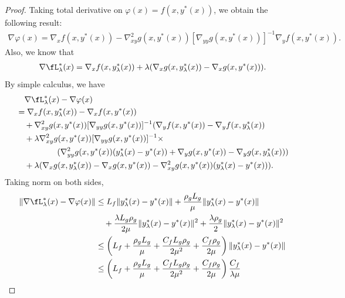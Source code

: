 \begin{proof}
Taking total derivative on $\varphi(x) = f(x,y^*(x))$, we obtain the following result:
\begin{align} \label{eq:hyper-grad}
    \nabla \varphi(x) = \nabla_x f(x,y^*(x)) - \nabla_{xy}^2 g(x,y^*(x)) [ \nabla_{yy} g(x,y^*(x))]^{-1} \nabla_y f(x,y^*(x)). 
\end{align}
Also, we know that
\begin{align*}
    \nabla \fL_{\lambda}^*(x) = \nabla_x f(x,y_{\lambda}^*(x)) + \lambda (\nabla_x g(x,y_{\lambda}^*(x)) - \nabla_x g(x,y^*(x))).
\end{align*}
By simple calculus, we have
\begin{align*}
    &\quad \nabla \fL_{\lambda}^*(x) - \nabla \varphi(x) \\
    &= \nabla_x f(x,y_{\lambda}^*(x)) - \nabla_x f(x,y^*(x)) \\
    &\quad + \nabla_{xy}^2 g(x,y^*(x)) [ \nabla_{yy} g(x,y^*(x))]^{-1} (\nabla_y f(x,y^*(x)) - \nabla_y f(x,y_{\lambda}^*(x)) \\
    &\quad + \lambda \nabla_{xy}^2 g(x,y^*(x)) [ \nabla_{yy} g(x,y^*(x))]^{-1} \times \\
    &~~~~~~~~~~~~~~~( \nabla_{yy}^2 g(x,y^*(x)) (y_{\lambda}^*(x) - y^*(x)) + \nabla_y g(x,y^*(x)) - \nabla_y g(x,y_{\lambda}^*(x)) ) \\
    &\quad + \lambda ( \nabla_x g(x,y_{\lambda}^*(x)) - \nabla_x  g(x,y^*(x)) - \nabla_{xy}^2 g(x,y^*(x)) (y_{\lambda}^*(x) - y^*(x)) ).
\end{align*}
Taking norm on both sides,
\begin{align*}
    \Vert \nabla \fL_{\lambda}^*(x) - \nabla \varphi(x) \Vert &\le L_f \Vert y_{\lambda}^*(x) - y^*(x) \Vert + \frac{\rho_g L_g}{\mu} \Vert y_{\lambda}^*(x) - y^*(x) \Vert  \\
    &\quad + \frac{\lambda L_g \rho_g}{2\mu} \Vert y_{\lambda}^*(x) - y^*(x) \Vert^2  + \frac{\lambda \rho_g}{2} \Vert y_{\lambda}^*(x) - y^*(x) \Vert^2 \\
    &\le \left( L_f 
   + \frac{\rho_g L_g}{\mu} + \frac{C_f L_g \rho_g}{2\mu^2} + \frac{C_f \rho_g}{2\mu} 
    \right) \Vert y_{\lambda}^*(x) - y^*(x) \Vert \\
    &\le \left( L_f 
   + \frac{\rho_g L_g}{\mu} + \frac{C_f L_g \rho_g}{2\mu^2} + \frac{C_f \rho_g}{2\mu} 
    \right) \frac{C_f}{\lambda \mu}
\end{align*}


\end{proof}

